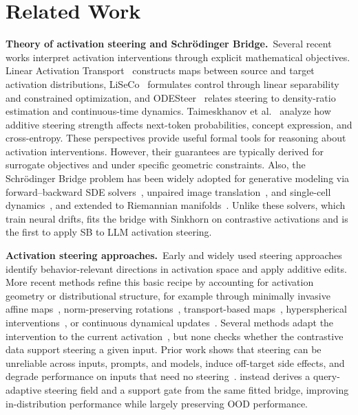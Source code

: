 \vspace{-1mm}
\section{Related Work}
\label{sec:related}
\noindent\textbf{Theory of activation steering and Schr\"odinger Bridge.}~Several recent works interpret activation interventions through explicit mathematical objectives. Linear Activation Transport~\citep{rodriguez2025controlling} constructs maps between source and target activation distributions, LiSeCo~\citep{cheng2024linearly} formulates control through linear separability and constrained optimization, and ODESteer~\citep{zhaoodesteer} relates steering to density-ratio estimation and continuous-time dynamics. Taimeskhanov et al.~\citep{taimeskhanov2026towards} analyze how additive steering strength affects next-token probabilities, concept expression, and cross-entropy. These perspectives provide useful formal tools for reasoning about activation interventions. However, their guarantees are typically derived for surrogate objectives and under specific geometric constraints. Also, the Schr\"odinger Bridge problem has been widely adopted for generative modeling via forward--backward SDE solvers~\citep{de2021diffusion, chen2021likelihood, shi2023diffusion}, unpaired image translation~\citep{kim2023unpaired}, and single-cell dynamics~\citep{tong2023simulation}, and extended to Riemannian manifolds~\citep{thornton2022riemannian}. Unlike these solvers, which train neural drifts, \Cobras fits the bridge with Sinkhorn on contrastive activations and is the first to apply SB to LLM activation steering.

\noindent\textbf{Activation steering approaches.}~Early and widely used steering approaches~\cite{zou2023representation, li2023inference, rimsky2024steering} identify behavior-relevant directions in activation space and apply additive edits. More recent methods refine this basic recipe by accounting for activation geometry or distributional structure, for example through minimally invasive affine maps~\citep{singh2024representation}, norm-preserving rotations~\citep{pham2024householder}, transport-based maps~\citep{rodriguez2025controlling}, hyperspherical interventions~\citep{you2026spherical}, or continuous dynamical updates~\citep{zhaoodesteer}. Several methods adapt the intervention to the current activation~\citep{pham2024householder, you2026spherical, zhaoodesteer, wang2025truthflow}, but none checks whether the contrastive data support steering a given input. Prior work shows that steering can be unreliable across inputs, prompts, and models, induce off-target side effects, and degrade performance on inputs that need no steering~\citep{tan2024analysing, da2025steering, raedler2025necessity, stickland2024steering}. \Cobras instead derives a query-adaptive steering field and a support gate from the same fitted bridge, improving in-distribution performance while largely preserving OOD performance.

